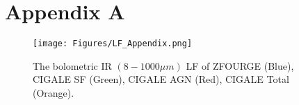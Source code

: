 \onecolumn

\section*{Appendix A} \label{Sec: Appendix}

\begin{figure}[h!]
    \texttt{[image: Figures/LF\_Appendix.png]}
    \caption{The bolometric IR $(8-1000\mu m)$ LF of ZFOURGE (Blue), CIGALE SF (Green), CIGALE AGN (Red), CIGALE Total (Orange).}
    \label{Fig: Appendix LF}
\end{figure}